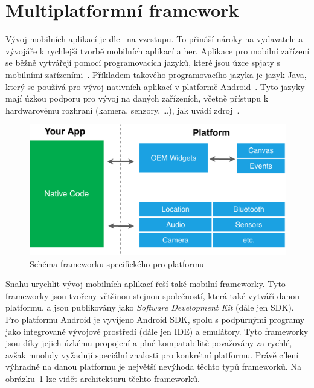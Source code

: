 \section{Multiplatformní framework}

Vývoj mobilních aplikací je dle~\cite{wepc_video_game_statistics} na vzestupu.
To přináší nároky na vydavatele a vývojáře k rychlejší tvorbě mobilních
aplikací a her.
Aplikace pro mobilní zařízení se běžně vytvářejí pomocí programovacích jazyků,
které jsou úzce spjaty
s mobilními zařízeními~\cite{dashmagazine_mobile_frameworks}.
Příkladem takového programovacího jazyka je jazyk Java,
který se používá pro vývoj nativních aplikací
v platformě Android~\cite{dashmagazine_mobile_frameworks}.
Tyto jazyky mají úzkou podporu pro vývoj na daných zařízeních,
včetně přístupu k hardwarovému rozhraní (kamera, senzory, \dots{}),
jak uvádí zdroj~\cite{dashmagazine_mobile_frameworks}. 

\begin{figure}[ht!]
    \centering
    \includegraphics[width=\linewidth]{assets/technology-research/framework/platform_sdk.pdf}
    \caption{Schéma frameworku specifického pro platformu~\cite{hackernoon_flutter}}
    \label{fig:framework_platform}
\end{figure}

Snahu urychlit vývoj mobilních aplikací řeší také mobilní frameworky.
Tyto frameworky jsou tvořeny většinou stejnou společností,
která také vytváří danou platformu,
a jsou publikovány jako \emph{Software Development Kit} (dále jen SDK).
Pro platformu Android je vyvíjeno Android SDK,
spolu s podpůrnými programy jako integrované vývojové prostředí
(dále jen IDE) a emulátory.
Tyto frameworky jsou díky jejich úzkému propojení a plné kompatabilitě
považovány za rychlé,
avšak mnohdy vyžadují speciální znalosti pro konkrétní platformu.
Právě cílení výhradně na danou platformu je největší nevýhoda těchto typů
frameworků.
Na obrázku~\ref{fig:framework_platform} lze vidět architekturu těchto
frameworků.~\cite{dashmagazine_mobile_frameworks}


